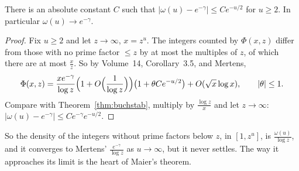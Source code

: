 \begin{corollary}\label{cor:buchstablimit}
There is an absolute constant $C$ such that $|\omega(u)-e^{-\gamma}|\le Ce^{-u/2}$ for $u\ge2$. In particular $\omega(u)\to e^{-\gamma}$.
\end{corollary}
\begin{proof}
Fix $u\ge2$ and let $z\to\infty$, $x=z^u$. The integers counted by $\Phi(x,z)$ differ from those with no prime factor $\le z$ by at most the multiples of $z$, of which there are at most $\frac xz$. So by Volume~14, Corollary~3.5, and Mertens,
\[
\Phi(x,z)=\frac{xe^{-\gamma}}{\log z}\Bigl(1+O\Bigl(\frac1{\log z}\Bigr)\Bigr)\bigl(1+\theta Ce^{-u/2}\bigr)+O(\sqrt x\log x),\qquad|\theta|\le1.
\]
Compare with Theorem~\ref{thm:buchstab}, multiply by $\frac{\log z}x$ and let $z\to\infty$: $|\omega(u)-e^{-\gamma}|\le Ce^{-\gamma}e^{-u/2}$.
\end{proof}

So the density of the integers without prime factors below $z$, in $[1,z^u]$, is $\frac{\omega(u)}{\log z}$, and it converges to Mertens' $\frac{e^{-\gamma}}{\log z}$ as $u\to\infty$, but it never settles. The way it approaches its limit is the heart of Maier's theorem.

